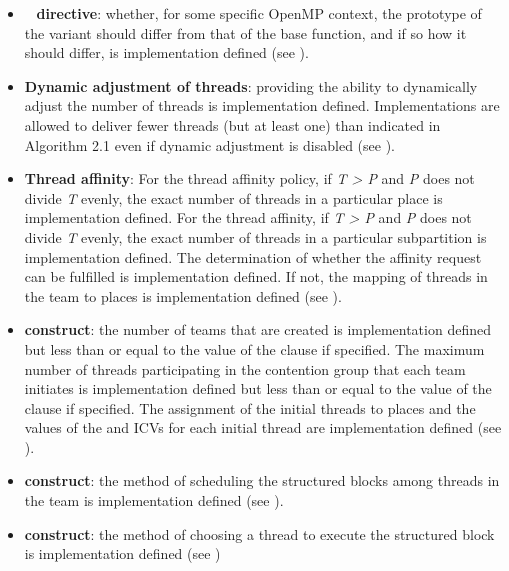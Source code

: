 \begin{itemize}
\item {}~ \textbf{directive}: whether, for some specific
  OpenMP context, the prototype of the variant should differ from that of
  the base function, and if so how it should differ, is implementation defined
  (see ).

\item \textbf{Dynamic adjustment of threads}: providing the ability to dynamically adjust the
number of threads is implementation defined. Implementations are allowed to deliver
fewer threads (but at least one) than indicated in Algorithm 2.1 even if dynamic
adjustment is disabled (see ).

\item \textbf{Thread affinity}: For the  thread affinity
  policy, if \emph{T > P} and \emph{P} does not divide \emph{T} evenly, the exact
  number of threads in a particular place is implementation defined.
  For the  thread affinity, if \emph{T > P} and \emph{P} does not
  divide \emph{T} evenly, the exact number of threads in a particular
  subpartition is implementation defined.  The determination of
  whether the affinity request can be fulfilled is implementation
  defined.  If not, the mapping of threads in the team 
  to places is implementation defined (see
  ).

\item {} \textbf{construct}: the number of teams that are created is implementation defined but
less than or equal to the value of the  clause if specified. The maximum
number of threads participating in the contention group that each team initiates is
implementation defined but less than or equal to the value of the 
clause if specified.  The assignment of the initial threads to places and
the values of the  and
 ICVs for each initial thread are
implementation defined (see ).

\item {} \textbf{construct}: the method of scheduling the structured blocks among threads
in the team is implementation defined (see ).

\item {} \textbf{construct}: the method of choosing a thread to execute the structured block
is implementation defined (see )


\end{itemize}
